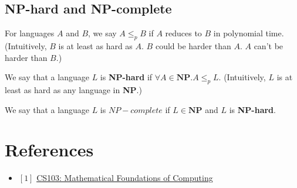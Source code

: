 \documentclass[12pt, letterpaper, oneside]{book}
\begin{document}
\section{NP-hard and NP-complete}

For languages $A$ and $B$, we say $A \le_p B$ if $A$ reduces to $B$ in polynomial time. (Intuitively, $B$ is at least
as hard as $A$. $B$ could be harder than $A$. $A$ can't be harder than $B$.)

We say that a language $L$ is \textbf{NP-hard} if $\forall A \in \mathbf{NP}. A \le_p L$. (Intuitively, $L$ is at least
as hard as any language in \textbf{NP}.)

We say that a language $L$ is $NP-complete$ if $L \in \mathbf{NP}$ and $L$ is \textbf{NP-hard}.

%
%

\chapter*{References}

\begin{itemize}
  \item $[1]$ \href{https://web.stanford.edu/class/cs103/}{CS103: Mathematical Foundations of Computing}
\end{itemize}
\end{document}
